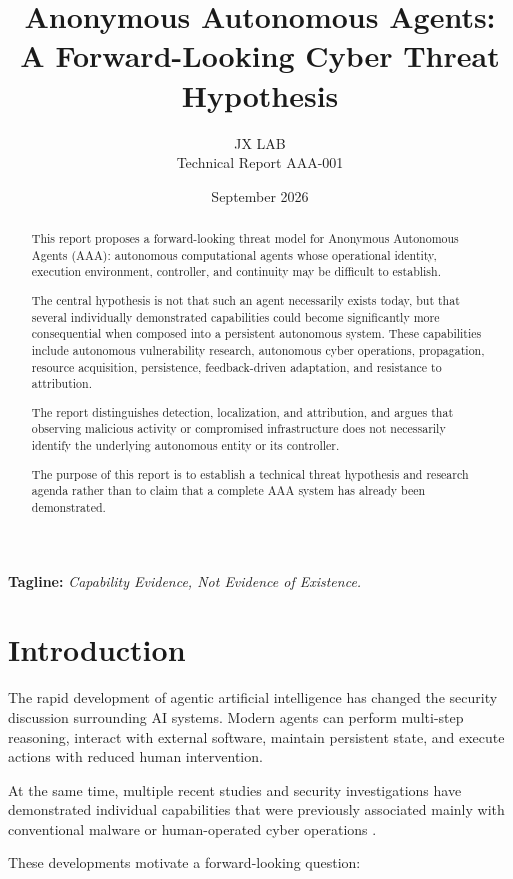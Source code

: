 \documentclass[11pt,a4paper]{article}
\title{
\textbf{Anonymous Autonomous Agents:}\\
A Forward-Looking Cyber Threat Hypothesis
}
\author{
JX LAB\\
Technical Report AAA-001
}
\date{September 2026}
\begin{document}
\maketitle

\begin{abstract}

This report proposes a forward-looking threat model for Anonymous Autonomous
Agents (AAA): autonomous computational agents whose operational identity,
execution environment, controller, and continuity may be difficult to
establish.

The central hypothesis is not that such an agent necessarily exists today,
but that several individually demonstrated capabilities could become
significantly more consequential when composed into a persistent autonomous
system. These capabilities include autonomous vulnerability research,
autonomous cyber operations, propagation, resource acquisition, persistence,
feedback-driven adaptation, and resistance to attribution.

The report distinguishes detection, localization, and attribution, and argues
that observing malicious activity or compromised infrastructure does not
necessarily identify the underlying autonomous entity or its controller.

The purpose of this report is to establish a technical threat hypothesis and
research agenda rather than to claim that a complete AAA system has already
been demonstrated.

\end{abstract}

\textbf{Tagline:} \emph{Capability Evidence, Not Evidence of Existence.}

\section{Introduction}

The rapid development of agentic artificial intelligence has changed the
security discussion surrounding AI systems. Modern agents can perform
multi-step reasoning, interact with external software, maintain persistent
state, and execute actions with reduced human intervention.

At the same time, multiple recent studies and security investigations have
demonstrated individual capabilities that were previously associated mainly
with conventional malware or human-operated cyber operations
\cite{R1,R2,R3,R5,R6}.

These developments motivate a forward-looking question:
\end{document}
